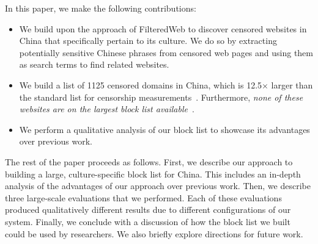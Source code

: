 In this paper, we make the following contributions:
\begin{itemize}
  \item We build upon the approach of FilteredWeb to discover censored
websites in China that specifically pertain to its culture. We do so
by extracting potentially sensitive Chinese phrases from censored
web pages and using them as search terms to find related websites.
  \item We build a list of 1125 censored domains in China, which is
12.5$\times$ larger than the standard list for censorship
measurements~\cite{citizenlab:block}. Furthermore, \textit{none of
these websites are on the largest block list
available}~\cite{darer2017filteredweb}.
  \item We perform a qualitative analysis of our block list to
    showcase its advantages over previous work.
\end{itemize}

The rest of the paper proceeds as follows. First, we describe our
approach to building a large, culture-specific block list for
China. This includes an in-depth analysis of the advantages of our
approach over previous work. Then, we describe three large-scale
evaluations that we performed. Each of these evaluations
produced qualitatively different results due to different
configurations of our system. Finally, we conclude
with a discussion of how the block list we built could be used by
researchers. We also briefly explore directions for future work.